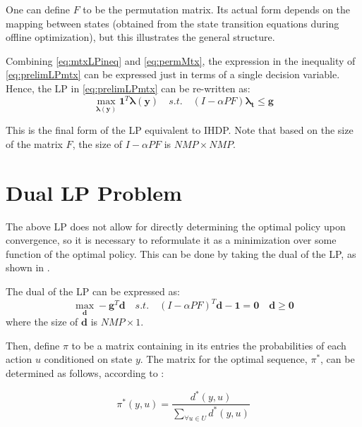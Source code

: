 \documentclass[conference]{IEEEtran}
\begin{document}
One can define $F$ to be the permutation matrix. Its actual form depends on the mapping between states (obtained from the state transition equations during offline optimization), but this illustrates the general structure.

Combining \eqref{eq:mtxLPineq} and \eqref{eq:permMtx}, the expression in the inequality of \eqref{eq:prelimLPmtx} can be expressed just in terms of a single decision variable. Hence, the LP in \eqref{eq:prelimLPmtx} can be re-written as:
\begin{equation} \label{eq:LPfinal}
    \max_{\boldsymbol{\lambda(y)}} \boldsymbol{1}^{T} \boldsymbol{\lambda(y)}
    \hspace{1em}s.t.\hspace{1em}
    (I-\alpha PF)\boldsymbol{\lambda_{t}} \leq \boldsymbol{g}
\end{equation}

This is the final form of the LP equivalent to IHDP. Note that based on the size of the matrix $F$, the size of $I-\alpha PF$ is $NMP\times NMP$.

\section{Dual LP Problem}
The above LP does not allow for directly determining the optimal policy upon convergence, so it is necessary to reformulate it as a minimization over some function of the optimal policy. This can be done by taking the dual of the LP, as shown in \cite{4220813}.

The dual of the LP can be expressed as:
\begin{equation}
    \max_{\boldsymbol{d}} -\boldsymbol{g}^{T} \boldsymbol{d}
    \hspace{1em}s.t.\hspace{1em}(I-\alpha PF)^{T}\boldsymbol{d} - \boldsymbol{1} = \boldsymbol{0}\hspace{1em}\boldsymbol{d} \geq \boldsymbol{0}
\end{equation}
where the size of $\boldsymbol{d}$ is $NMP\times 1$.

Then, define $\pi$ to be a matrix containing in its entries the probabilities of each action $u$ conditioned on state $y$. The matrix for the optimal sequence, $\pi^{*}$, can be determined as follows, according to \cite{4220813}:

\begin{equation}
\pi^{*}(y,u)=\frac{d^{*}(y,u)}{\sum_{\forall u \in U}d^{*}(y,u)}
\end{equation}
\end{document}
